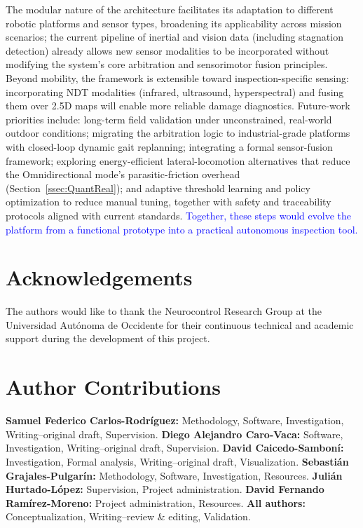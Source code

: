 \documentclass[preprint,12pt]{elsarticle}
\newcommand{\revblue}[1]{\textcolor{blue}{#1}}
\begin{document}
The modular nature of the architecture facilitates its adaptation to different robotic platforms and sensor types, broadening its applicability across mission scenarios; the current pipeline of inertial and vision data (including stagnation detection) already allows new sensor modalities to be incorporated without modifying the system's core arbitration and sensorimotor fusion principles. Beyond mobility, the framework is extensible toward inspection-specific sensing: incorporating NDT modalities (infrared, ultrasound, hyperspectral) and fusing them over 2.5D maps will enable more reliable damage diagnostics. Future-work priorities include: long-term field validation under unconstrained, real-world outdoor conditions; migrating the arbitration logic to industrial-grade platforms with closed-loop dynamic gait replanning; integrating a formal sensor-fusion framework; exploring energy-efficient lateral-locomotion alternatives that reduce the Omnidirectional mode's parasitic-friction overhead (Section~\ref{ssec:QuantReal}); and adaptive threshold learning and policy optimization to reduce manual tuning, together with safety and traceability protocols aligned with current standards. \revblue{Together, these steps would evolve the platform from a functional prototype into a practical autonomous inspection tool.}

\section*{Acknowledgements}

The authors would like to thank the Neurocontrol Research Group at the Universidad Autónoma de Occidente for their continuous technical and academic support during the development of this project.

\section*{Author Contributions}

\textbf{Samuel Federico Carlos-Rodríguez:} Methodology, Software, Investigation, Writing--original draft, Supervision.
\textbf{Diego Alejandro Caro-Vaca:} Software, Investigation, Writing--original draft, Supervision.
\textbf{David Caicedo-Samboní:} Investigation, Formal analysis, Writing--original draft, Visualization.
\textbf{Sebastián Grajales-Pulgarín:} Methodology, Software, Investigation, Resources.
\textbf{Julián Hurtado-López:} Supervision, Project administration.
\textbf{David Fernando Ramírez-Moreno:} Project administration, Resources.
\textbf{All authors:} Conceptualization, Writing--review \& editing, Validation.
\end{document}
